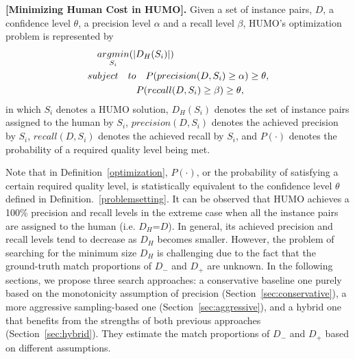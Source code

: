 \begin{definition}
\label{optimization}
{\bf [Minimizing Human Cost in HUMO].} Given a set of instance pairs, $D$, a confidence level $\theta$, a precision level $\alpha$ and a recall level $\beta$, HUMO's optimization problem is represented by
\begin{equation}
\begin{split}
& \quad \underset{S_i}{argmin} (|D_H(S_i)|)\\
& subject \quad to \quad P(precision(D,S_i)\geq\alpha)\geq\theta , \\
& \hspace{0.7in} P(recall(D,S_i)\geq\beta)\geq\theta ,
\end{split}
\label{eq:minimization}
\end{equation}
in which $S_i$ denotes a HUMO solution, $D_H(S_i)$ denotes the set of instance pairs assigned to the human by $S_i$, $precision(D,S_i)$ denotes the achieved precision by $S_i$, $recall(D,S_i)$ denotes the achieved recall by $S_i$, and $P(\cdot)$ denotes the probability of a required quality level being met.
\end{definition}

  Note that in Definition~\ref{optimization}, $P(\cdot)$, or the probability of satisfying a certain required quality level, is statistically equivalent to the confidence level $\theta$ defined in Definition.~\ref{problemsetting}. It can be observed that HUMO achieves a 100\% precision and recall levels in the extreme case when all the instance pairs are assigned to the human (i.e. $D_H$=$D$). In general, its achieved precision and recall levels tend to decrease as $D_H$ becomes smaller. However, the problem of searching for the minimum size $D_H$ is challenging due to the fact that the ground-truth match proportions of $D_-$ and $D_+$ are unknown. In the following sections, we propose three search approaches: a conservative baseline one purely based on the monotonicity assumption of precision (Section~\ref{sec:conservative}), a more aggressive sampling-based one (Section~\ref{sec:aggressive}), and a hybrid one that benefits from the strengths of both previous approaches (Section~\ref{sec:hybrid}). They estimate the match proportions of $D_-$ and $D_+$ based on different assumptions.


\iffalse	
	According to Eq.~\ref{eq:precision} and ~\ref{eq:recall}, $precision(D,S_i)$ can be represented by
\begin{equation}
  \frac{|D_H|\cdot \mathsf{R}(D_H)+|D_+|\cdot \mathsf{R}(D_+)}{|D_H|\cdot \mathsf{R}(D_H)+|D_+|},
\end{equation}
in which $\mathsf{R}(D_*)$ denotes the ground-truth match proportion of the pair instances in $D_*$. Similarly, $recall(D,S_i)$ can be represented by
\begin{equation}
  \frac{|D_H|\cdot \mathsf{R}(D_H)+|D_+|\cdot \mathsf{R}(D_+)}{|D_-|\cdot \mathsf{R}(D_-)+|D_H|\cdot \mathsf{R}(D_H)+|D_+|\cdot \mathsf{R}(D_+)}.
\end{equation}
\fi













